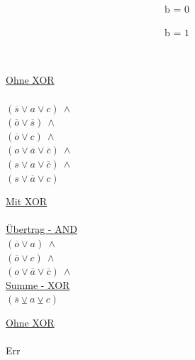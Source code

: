 \begin{figure}[!h]
  \centering
  \begin{minipage}[c]{0.3cm}
    ~
  \end{minipage}
  \begin{minipage}[c]{7.1cm}
    ~~~~~~~~~~~~~~~~~~~~~~~~~~~~~~~~b = $0$
  \end{minipage}
  \begin{minipage}[c]{7cm}
    ~~~~~~~~~~~~~~~~~~~~~~~~~~~~~~~~b = $1$
  \end{minipage}
  \begin{minipage}[l]{0.4cm}
    ~
  \end{minipage}
  \begin{minipage}[l]{3.5cm}
    \underline{Ohne XOR}\\
    ~\\
    $ (\overline{s} \vee a \vee c) ~ \wedge $\\
    $ (\overline{o} \vee \overline{s}) ~ \wedge $\\
    $ (\overline{o} \vee c) ~ \wedge $\\
    $ (o \vee \overline{a} \vee \overline{c}) ~ \wedge $\\
    $ (s \vee a \vee \overline{c}) ~ \wedge $\\
    $ (s \vee \overline{a} \vee c) $
  \end{minipage}
  \begin{minipage}[l]{3.5cm}
    \underline{Mit XOR}\\
    ~\\
    \underline{Übertrag - AND}\\
    $ (\overline{o} \vee a) ~ \wedge $\\
    $ (\overline{o} \vee c) ~ \wedge $\\
    $ (o \vee \overline{a} \vee \overline{c}) ~ \wedge $\\
    \underline{Summe - XOR}\\
    $ (\overline{s} \veebar a \veebar c) $
  \end{minipage}
  \begin{minipage}[l]{3.5cm}
    \underline{Ohne XOR}\\
    ~\\
    Err\\
    ~\\
    ~\\
    ~\\
    ~\\
    ~
  \end{minipage}
  \begin{minipage}[l]{3.5cm}

\end{minipage}
\end{figure}

